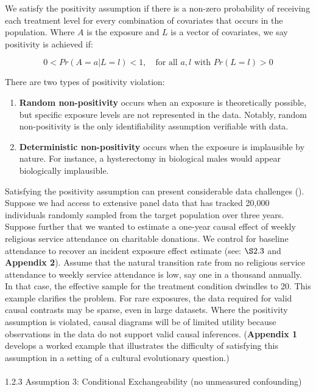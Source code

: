 \documentclass[
  single column]{article}
\makeatletter
\let\oldparagraph\paragraph
\renewcommand{\paragraph}{
    \@ifstar
      \xxxParagraphStar
      \xxxParagraphNoStar
  }
\newcommand{\xxxParagraphStar}[1]{\oldparagraph*{#1}\mbox{}}
\newcommand{\xxxParagraphNoStar}[1]{\oldparagraph{#1}\mbox{}}
\makeatother
\begin{document}
We satisfy the positivity assumption if there is a non-zero probability
of receiving each treatment level for every combination of covariates
that occurs in the population. Where \(A\) is the exposure and \(L\) is
a vector of covariates, we say positivity is achieved if:

\[
0 < Pr(A = a | L = l) < 1, \quad \text{for all } a, l \text{ with } Pr(L = l) > 0
\]

There are two types of positivity violation:

\begin{enumerate}
\def\labelenumi{\arabic{enumi}.}
\item
  \textbf{Random non-positivity} occurs when an exposure is
  theoretically possible, but specific exposure levels are not
  represented in the data. Notably, random non-positivity is the only
  identifiability assumption verifiable with data.
\item
  \textbf{Deterministic non-positivity} occurs when the exposure is
  implausible by nature. For instance, a hysterectomy in biological
  males would appear biologically implausible.
\end{enumerate}

Satisfying the positivity assumption can present considerable data
challenges ().
Suppose we had access to extensive panel data that has tracked 20,000
individuals randomly sampled from the target population over three
years. Suppose further that we wanted to estimate a one-year causal
effect of weekly religious service attendance on charitable donations.
We control for baseline attendance to recover an incident exposure
effect estimate (see: \(\S 2.3\) and \textbf{Appendix 2}). Assume that
the natural transition rate from no religious service attendance to
weekly service attendance is low, say one in a thousand annually. In
that case, the effective sample for the treatment condition dwindles to
20. This example clarifies the problem. For rare exposures, the data
required for valid causal contrasts may be sparse, even in large
datasets. Where the positivity assumption is violated, causal diagrams
will be of limited utility because observations in the data do not
support valid causal inferences. (\textbf{Appendix 1} develops a worked
example that illustrates the difficulty of satisfying this assumption in
a setting of a cultural evolutionary question.)

\paragraph{1.2.3 Assumption 3: Conditional Exchangeability (no
unmeasured
confounding)}\label{assumption-3-conditional-exchangeability-no-unmeasured-confounding}
\end{document}
